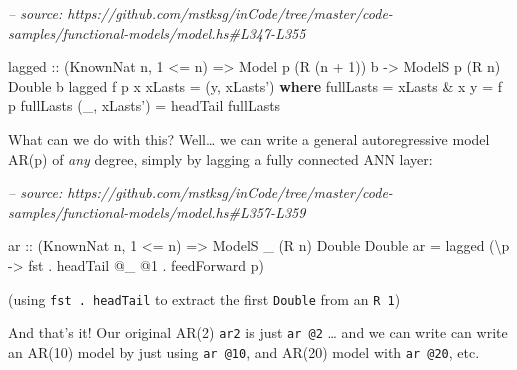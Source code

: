 \documentclass[]{article}
\newenvironment{Shaded}{}{}
\newcommand{\CommentTok}[1]{\textcolor[rgb]{0.38,0.63,0.69}{\textit{#1}}}
\newcommand{\DataTypeTok}[1]{\textcolor[rgb]{0.56,0.13,0.00}{#1}}
\newcommand{\DecValTok}[1]{\textcolor[rgb]{0.25,0.63,0.44}{#1}}
\newcommand{\FunctionTok}[1]{\textcolor[rgb]{0.02,0.16,0.49}{#1}}
\newcommand{\KeywordTok}[1]{\textcolor[rgb]{0.00,0.44,0.13}{\textbf{#1}}}
\newcommand{\NormalTok}[1]{#1}
\newcommand{\OtherTok}[1]{\textcolor[rgb]{0.00,0.44,0.13}{#1}}
\begin{document}
\begin{Shaded}
\begin{Highlighting}[]
\CommentTok{-- source: https://github.com/mstksg/inCode/tree/master/code-samples/functional-models/model.hs#L347-L355}

\NormalTok{lagged}
\OtherTok{    ::}\NormalTok{ (}\DataTypeTok{KnownNat}\NormalTok{ n, }\DecValTok{1} \FunctionTok{<=}\NormalTok{ n)}
    \OtherTok{=>} \DataTypeTok{Model}\NormalTok{  p       (}\DataTypeTok{R}\NormalTok{ (n }\FunctionTok{+} \DecValTok{1}\NormalTok{)) b}
    \OtherTok{->} \DataTypeTok{ModelS}\NormalTok{ p (}\DataTypeTok{R}\NormalTok{ n) }\DataTypeTok{Double}\NormalTok{      b}
\NormalTok{lagged f p x xLasts }\FunctionTok{=}\NormalTok{ (y, xLasts')}
  \KeywordTok{where}
\NormalTok{    fullLasts    }\FunctionTok{=}\NormalTok{ xLasts }\FunctionTok{&}\NormalTok{ x}
\NormalTok{    y            }\FunctionTok{=}\NormalTok{ f p fullLasts}
\NormalTok{    (_, xLasts') }\FunctionTok{=}\NormalTok{ headTail fullLasts}
\end{Highlighting}
\end{Shaded}

What can we do with this? Well\ldots{} we can write a general autoregressive
model AR(p) of \emph{any} degree, simply by lagging a fully connected ANN layer:

\begin{Shaded}
\begin{Highlighting}[]
\CommentTok{-- source: https://github.com/mstksg/inCode/tree/master/code-samples/functional-models/model.hs#L357-L359}

\OtherTok{ar ::}\NormalTok{ (}\DataTypeTok{KnownNat}\NormalTok{ n, }\DecValTok{1} \FunctionTok{<=}\NormalTok{ n)}
   \OtherTok{=>} \DataTypeTok{ModelS}\NormalTok{ _ (}\DataTypeTok{R}\NormalTok{ n) }\DataTypeTok{Double} \DataTypeTok{Double}
\NormalTok{ar }\FunctionTok{=}\NormalTok{ lagged (\textbackslash{}p }\OtherTok{->}\NormalTok{ fst }\FunctionTok{.}\NormalTok{ headTail }\FunctionTok{@}\NormalTok{_ }\FunctionTok{@}\DecValTok{1} \FunctionTok{.}\NormalTok{ feedForward p)}
\end{Highlighting}
\end{Shaded}

(using \texttt{fst\ .\ headTail} to extract the first \texttt{Double} from an
\texttt{R\ 1})

And that's it! Our original AR(2) \texttt{ar2} is just \texttt{ar\ @2} \ldots{}
and we can write can write an AR(10) model by just using \texttt{ar\ @10}, and
AR(20) model with \texttt{ar\ @20}, etc.
\end{document}
